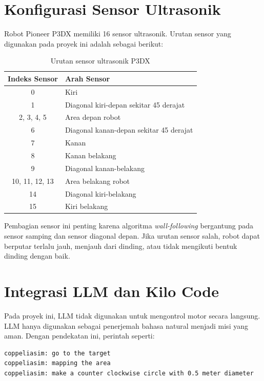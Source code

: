 \documentclass{article}
\begin{document}
\section{Konfigurasi Sensor Ultrasonik}

Robot Pioneer P3DX memiliki 16 sensor ultrasonik. Urutan sensor yang digunakan pada proyek ini adalah sebagai berikut:

\begin{table}[H]
\centering
\caption{Urutan sensor ultrasonik P3DX}
\begin{tabular}{@{}cl@{}}
\toprule
\textbf{Indeks Sensor} & \textbf{Arah Sensor} \\
\midrule
0 & Kiri \\
1 & Diagonal kiri-depan sekitar 45 derajat \\
2, 3, 4, 5 & Area depan robot \\
6 & Diagonal kanan-depan sekitar 45 derajat \\
7 & Kanan \\
8 & Kanan belakang \\
9 & Diagonal kanan-belakang \\
10, 11, 12, 13 & Area belakang robot \\
14 & Diagonal kiri-belakang \\
15 & Kiri belakang \\
\bottomrule
\end{tabular}
\end{table}

Pembagian sensor ini penting karena algoritma \textit{wall-following} bergantung pada sensor samping dan sensor diagonal depan. Jika urutan sensor salah, robot dapat berputar terlalu jauh, menjauh dari dinding, atau tidak mengikuti bentuk dinding dengan baik.

\section{Integrasi LLM dan Kilo Code}

Pada proyek ini, LLM tidak digunakan untuk mengontrol motor secara langsung. LLM hanya digunakan sebagai penerjemah bahasa natural menjadi misi yang aman. Dengan pendekatan ini, perintah seperti:

\begin{lstlisting}[style=bashstyle]
coppeliasim: go to the target
coppeliasim: mapping the area
coppeliasim: make a counter clockwise circle with 0.5 meter diameter
\end{lstlisting}
\end{document}
